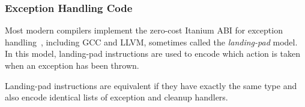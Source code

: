 \subsubsection{Exception Handling Code}

Most modern compilers implement the zero-cost Itanium ABI for exception
handling~\cite{dinechin00}, including GCC and LLVM, sometimes called the
\textit{landing-pad} model.
In this model, landing-pad instructions are used to encode which action is taken
when an exception has been thrown.


Landing-pad instructions are
equivalent if they have exactly the same type and also encode identical lists of exception and cleanup handlers. 


